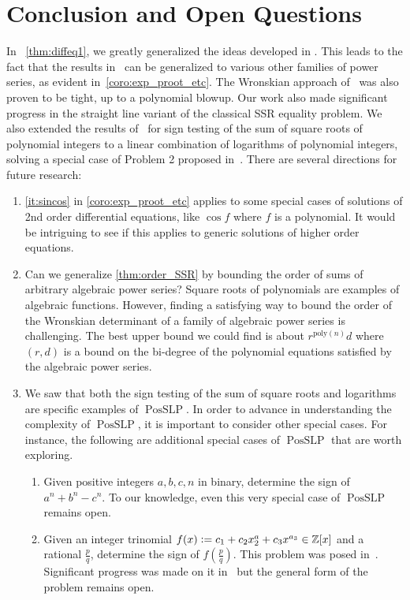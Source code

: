 \documentclass[a4paper, 11pt,dvipsnames]{article}
\newcommand\parc[1]{\left(#1\right)}
\newcommand{\posslp}{\operatorname{PosSLP}}
\newcommand{\eqdef}{\vcentcolon =}
\newcommand{\Z}{\mathbb{Z}}
\begin{document}
            \section{Conclusion and Open Questions}
In ~\cref{thm:diffeq1}, we greatly generalized the ideas developed in \cite{kayal2012sum}. This leads to the fact that the results in~\cite{kayal2012sum} can be generalized to various other families of power series, as evident in~\cref{coro:exp_proot_etc}. The Wronskian approach of~\cite{kayal2012sum} was also proven to be tight, up to a polynomial blowup. Our work also made significant progress in the straight line variant of the classical SSR equality problem. We also extended the results of~\cite{kayal2012sum} for sign testing of the sum of square roots of polynomial integers to a linear combination of logarithms of polynomial integers, solving a special case of Problem 2 proposed in~\cite{etessami2014note}. There are several directions for future research:
            \begin{enumerate}
              \item \cref{it:sincos} in \cref{coro:exp_proot_etc} applies to some special cases of solutions of 2nd order differential equations, like $\cos f$ where $f$ is a polynomial. It would be intriguing to see if this applies to generic solutions of higher order equations. 
              \item Can we generalize \cref{thm:order_SSR} by bounding the order of sums of arbitrary algebraic power series? Square roots of polynomials are examples of algebraic functions. However, finding a satisfying way to bound the order of the Wronskian determinant of a family of algebraic power series is challenging. The best upper bound we could find is about $r^{\mathrm{poly}(n)}d$ where $(r,d)$ is a bound on the bi-degree of the polynomial equations satisfied by the algebraic power series. 
\item We saw that both the sign testing of the sum of square roots and logarithms are specific examples of $\posslp$. In order to advance in understanding the complexity of $\posslp$, it is important to consider other special cases. For instance, the following are additional special cases of $\posslp$ that are worth exploring. 
            \begin{enumerate}
              \item Given positive integers $a,b,c,n$ in binary, determine the sign of $a^n+b^n-c^n$. To our knowledge, even this very special case of $\posslp$ remains open.
              \item Given an integer trinomial $f(x)\eqdef c_1 + c_2x^a_2 + c_3x^{a_3}\in \Z[x]$ and a rational $\frac{p}{q}$, determine the sign of $f\parc{\frac{p}{q}}$. This problem was posed in~\cite{KOIRAN2019151}. Significant progress was made on it in~\cite{Boniface2022TrinomialsAD} but the general form of the problem remains open.
            \end{enumerate}
            \end{enumerate}
\end{document}
